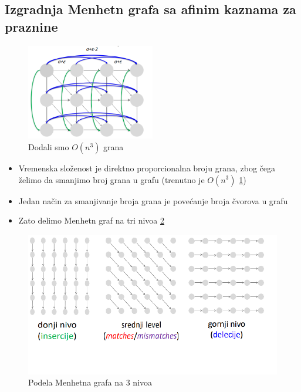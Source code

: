 \subsection{Izgradnja Menhetn grafa sa afinim kaznama za praznine}

\begin{figure}[h!]
\centering
\includegraphics[width=0.5\textwidth]{poglavlja/5/slike/MenhettnAifnePraznine.png}
\caption{Dodali smo $O(n^3)$ grana}
\label{slika:afiniMenhetn}
\end{figure}


\begin{itemize}
    \item Vremenska složenost je direktno proporcionalna broju grana, zbog čega želimo da smanjimo broj grana u grafu (trenutno je
$O(n^3)$ \ref{slika:afiniMenhetn})
\item Jedan način za smanjivanje broja grana je povećanje broja čvorova u grafu
\item Zato delimo Menhetn graf na tri nivoa \ref{slika:triNivoa}
\end{itemize}


\begin{figure}[h!]
\centering
\includegraphics[width=\textwidth]{poglavlja/5/slike/triNivoa.png}
\caption{Podela Menhetna grafa na 3 nivoa}
\label{slika:triNivoa}
\end{figure}

